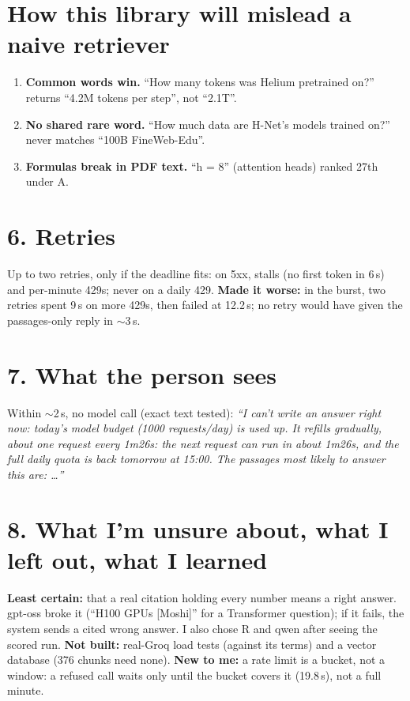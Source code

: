 \documentclass[10pt]{extarticle}
\begin{document}
\section*{How this library will mislead a naive retriever}
\begin{enumerate}
\item \textbf{Common words win.} ``How many tokens was Helium pretrained on?'' returns ``4.2M tokens per step'', not ``2.1T''.
\item \textbf{No shared rare word.} ``How much data are H-Net's models trained on?'' never matches ``100B FineWeb-Edu''.
\item \textbf{Formulas break in PDF text.} ``h = 8'' (attention heads) ranked 27th under A.
\end{enumerate}

\section*{6. Retries}
Up to two retries, only if the deadline fits: on 5xx, stalls (no first token in 6\,s) and per-minute 429s; never on a daily 429. \textbf{Made it worse:} in the burst, two retries spent 9\,s on more 429s, then failed at 12.2\,s; no retry would have given the passages-only reply in $\sim$3\,s.

\section*{7. What the person sees}
Within $\sim$2\,s, no model call (exact text tested):
{\small\itshape ``I can't write an answer right now: today's model budget (1000 requests/day) is used up. It refills gradually, about one request every 1m26s: the next request can run in about 1m26s, and the full daily quota is back tomorrow at 15:00. The passages most likely to answer this are: \dots''}

\section*{8. What I'm unsure about, what I left out, what I learned}
\textbf{Least certain:} that a real citation holding every number means a right answer. gpt-oss broke it (``H100 GPUs [Moshi]'' for a Transformer question); if it fails, the system sends a cited wrong answer. I also chose R and qwen after seeing the scored run. \textbf{Not built:} real-Groq load tests (against its terms) and a vector database (376 chunks need none). \textbf{New to me:} a rate limit is a bucket, not a window: a refused call waits only until the bucket covers it (19.8\,s), not a full minute.
\end{document}
